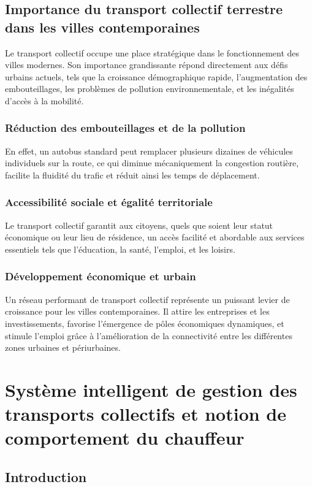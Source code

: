 \documentclass[a4paper, 12pt]{book}
\begin{document}
\section{Importance du transport collectif terrestre dans les villes contemporaines}

Le transport collectif occupe une place stratégique dans le fonctionnement des villes modernes. Son importance grandissante répond directement aux défis urbains actuels, tels que la croissance démographique rapide, l'augmentation des embouteillages, les problèmes de pollution environnementale, et les inégalités d'accès à la mobilité.

\subsection{Réduction des embouteillages et de la pollution}
En effet, un autobus standard peut remplacer plusieurs dizaines de véhicules individuels sur la route, ce qui diminue mécaniquement la congestion routière, facilite la fluidité du trafic et réduit ainsi les temps de déplacement.

\subsection{Accessibilité sociale et égalité territoriale}
Le transport collectif garantit aux citoyens, quels que soient leur statut économique ou leur lieu de résidence, un accès facilité et abordable aux services essentiels tels que l'éducation, la santé, l'emploi, et les loisirs.

\subsection{Développement économique et urbain}
Un réseau performant de transport collectif représente un puissant levier de croissance pour les villes contemporaines. Il attire les entreprises et les investissements, favorise l'émergence de pôles économiques dynamiques, et stimule l'emploi grâce à l'amélioration de la connectivité entre les différentes zones urbaines et périurbaines.

\chapter{Système intelligent de gestion des transports collectifs et notion de comportement du chauffeur}

\section{Introduction}
\end{document}
